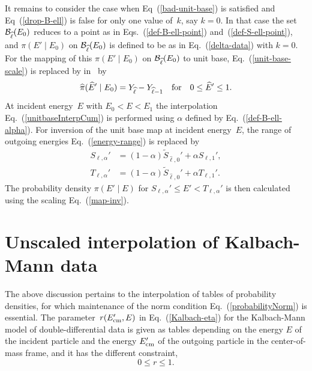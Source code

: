{It remains to consider the case when Eq~(\ref{bad-unit-base})
is satisfied and Eq~(\ref{drop-B-ell}) is false for only one value
of~$k$, say $k = 0$.  In that case the set $ {\cal B}_{\widehat \ell}(E_0)$
reduces to a point as in Eqs.~(\ref{def-B-ell-point}) and~(\ref{def-S-ell-point}), and
$\pi( E' \mid E_0 )$ on  $ {\cal B}_{\widehat \ell}(E_0)$ is defined to be as
in Eq.~(\ref{delta-data}) with $k = 0$.  For the mapping of this
$\pi( E' \mid E_0 )$ on  $ {\cal B}_{\widehat \ell}(E_0)$ to unit base,
Eq.~(\ref{unit-base-scale}) is replaced by in \gettransfer\ by
$$
  \widehat \pi(\widehat E' \mid E_0) = Y_{\widehat \ell} - Y_{\widehat \ell - 1}
  \quad \text{for} \quad
  0 \le \widehat E'  \le 1.
$$
At incident energy~$E$ with $E_0 < E < E_1$ the interpolation
Eq.~(\ref{unitbaseInterpCum}) is performed using $\alpha$
defined by Eq.~(\ref{def-B-ell-alpha}).  For inversion of the
unit base map at incident energy~$E$, the range of outgoing
energies Eq.~(\ref{energy-range}) is replaced by
\begin{equation*}
 \begin{split}
  S_{\ell,\alpha}' &= (1 - \alpha) \widetilde S_{\widehat \ell, 0}'  + \alpha S_{\ell,1}', \\
  T_{\ell,\alpha}' &= (1 - \alpha) \widetilde S_{\widehat \ell, 0}'  + \alpha T_{\ell,1}'.
 \end{split}
\end{equation*}
The probability density $\pi( E' \mid E )$ for $S_{\ell,\alpha}' \le E' <
T_{\ell,\alpha}'$ is then calculated using the scaling Eq.~(\ref{map-inv}).


\section{Unscaled interpolation of Kalbach-Mann data}\label{Sec:Kalbach-r-interp}
The above discussion pertains to the interpolation of tables of probability densities,
for which maintenance of the norm condition Eq.~(\ref{probabilityNorm})
is essential.  The parameter~$r(E_{\text{cm}}', E)$ in Eq.~(\ref{Kalbach-eta}) for the
Kalbach-Mann model of double-differential data is given as tables
depending on the energy $E$ of the incident particle and the energy $E_{\text{cm}}'$ of
the outgoing particle in the center-of-mass frame, and it has the different
constraint,
\begin{equation}
  0 \le r \le 1.
 \label{Kalbach-r-constraint}
\end{equation}

}
